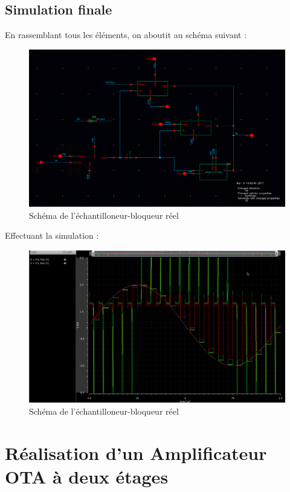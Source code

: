 \documentclass[11pt]{article}
\begin{document}
\clearpage

\subsection{Simulation finale}
En rassemblant tous les \'el\'ements, on aboutit au sch\'ema suivant :

\begin{figure}[!htb]
\begin{center}
  \includegraphics[width=0.8\linewidth]{EB-Schematic.png}
  \caption{Sch\'ema de l'\'echantilloneur-bloqueur r\'eel}
\end{center}
\end{figure}

Effectuant la simulation :

\begin{figure}[!htb]
\begin{center}
  \includegraphics[width=0.8\linewidth]{simu_ech_bloqueur.png}
  \caption{Sch\'ema de l'\'echantilloneur-bloqueur r\'eel}
\end{center}
\end{figure}


\clearpage
\section{R\'ealisation d'un Amplificateur OTA \`a deux \'etages}\label{OTA_sect}
\end{document}
